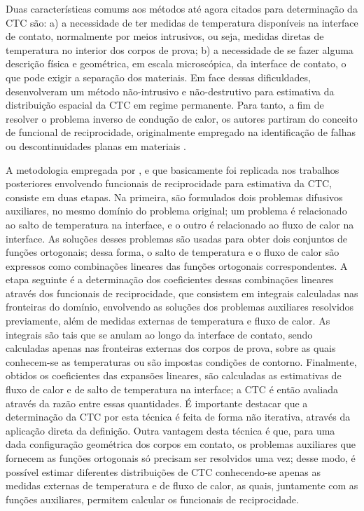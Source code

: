 Duas características comums aos métodos até agora citados para determinação da CTC são: a) a necessidade de ter medidas de temperatura disponíveis na interface de contato,
normalmente por meios intrusivos, ou seja, medidas diretas de temperatura no interior dos corpos de prova; b) a necessidade de se fazer alguma descrição física e geométrica, em
escala microscópica, da interface de contato, o que pode exigir a separação dos materiais. Em face dessas dificuldades, \cite{reciproc_3} desenvolveram
um método não-intrusivo e não-destrutivo para estimativa da distribuição espacial da CTC em regime permanente. Para tanto, a fim de resolver o problema inverso de condução de calor, os autores partiram do conceito de funcional de reciprocidade, originalmente
empregado na identificação de falhas ou descontinuidades planas em materiais \citep{artigo_andrieux}.

A metodologia empregada por \cite{reciproc_3}, e que basicamente foi replicada nos trabalhos posteriores envolvendo funcionais de reciprocidade para estimativa
da CTC, consiste em duas etapas. Na primeira,
são formulados dois problemas difusivos auxiliares, no mesmo domínio do problema original; um problema é relacionado ao salto de temperatura na interface, e
o outro é relacionado ao fluxo de calor na interface. As soluções desses problemas são usadas para obter dois conjuntos de funções ortogonais; dessa forma,
o salto de temperatura e o fluxo de calor são expressos como combinações lineares das funções ortogonais correspondentes. A etapa seguinte é a determinação 
dos coeficientes dessas combinações lineares através dos funcionais de reciprocidade, que consistem em integrais calculadas nas fronteiras do domínio, envolvendo as soluções dos
problemas auxiliares resolvidos previamente, além de medidas externas de temperatura e fluxo de calor. As integrais são tais que
se anulam ao longo da interface de contato, sendo calculadas apenas nas fronteiras externas dos corpos de prova, sobre as quais conhecem-se as temperaturas
ou são impostas condições de contorno. Finalmente, obtidos os coeficientes das expansões lineares, são calculadas as estimativas de fluxo de calor e de salto de temperatura na interface;
a CTC é então avaliada através da razão entre essas quantidades. É importante destacar que a determinação da CTC por esta técnica é feita de forma não iterativa,
através da aplicação direta da definição. Outra vantagem desta técnica é que, para uma dada configuração geométrica dos corpos em contato, os problemas auxiliares que
fornecem as funções ortogonais só precisam ser resolvidos uma vez; desse modo, é possível estimar diferentes distribuições de CTC conhecendo-se apenas as medidas externas de temperatura
e de fluxo de calor, as quais, juntamente com as funções auxiliares, permitem calcular os funcionais de reciprocidade.

